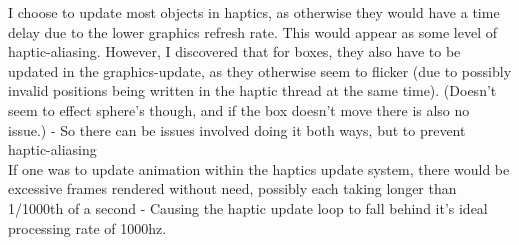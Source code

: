 \documentclass[oneside,letterpaper]{memoir}
\theoremstyle{definition}
\begin{document}
\begin{enumerate}
I choose to update most objects in haptics, as otherwise they would have a time delay due to the lower graphics refresh rate. This would appear as some level of haptic-aliasing. However, I discovered that for boxes, they also have to be updated in the graphics-update, as they otherwise seem to flicker (due to possibly invalid positions being written in the haptic thread at the same time). (Doesn't seem to effect sphere's though, and if the box doesn't move there is also no issue.) - So there can be issues involved doing it both ways, but to prevent haptic-aliasing\\
If one was to update animation within the haptics update system, there would be excessive frames rendered without need, possibly each taking longer than 1/1000th of a second - Causing the haptic update loop to fall behind it's ideal processing rate of 1000hz. \\
\end{enumerate}
\end{document}
